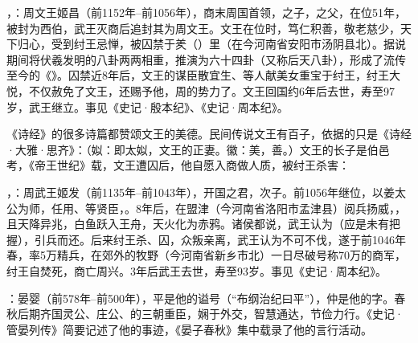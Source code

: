 ，：周文王姬昌（前1152年--前1056年），商末周国首领，之子，之父，在位51年，被封为西伯，武王灭商后追封其为周文王。文王在位时，笃仁积善，敬老慈少，天下归心，受到纣王忌惮，被囚禁于羑（）里（在今河南省安阳市汤阴县北）。据说期间将伏羲发明的八卦两两相重，推演为六十四卦（又称后天八卦），形成了流传至今的《》。囚禁近8年后，文王的谋臣散宜生、等人献美女重宝于纣王，纣王大悦，不仅赦免了文王，还赐予他，周的势力了。文王回国约6年后去世，寿至97岁，武王继立。事见《史记·殷本纪》、《史记·周本纪》。%

《诗经》的很多诗篇都赞颂文王的美德。民间传说文王有百子，依据的只是《诗经·大雅·思齐》：（姒：即太姒，文王的正妻。徽：美，善。）文王的长子是伯邑考，《帝王世纪》载，文王遭囚后，他自愿入商做人质，被纣王杀害： %

，：周武王姬发（前1135年--前1043年），开国之君，次子。前1056年继位，以姜太公为师，任用、等贤臣，。8年后，在盟津（今河南省洛阳市孟津县）阅兵扬威，，且天降异兆，白鱼跃入王舟，天火化为赤鸦。诸侯都说，武王认为（应是未有把握），引兵而还。后来纣王杀、囚，众叛亲离，武王认为不可不伐，遂于前1046年春，率5万精兵，在郊外的牧野（今河南省新乡市北）一日尽破号称70万的商军，纣王自焚死，商亡周兴。3年后武王去世，寿至93岁。事见《史记·周本纪》。

：晏婴（前578年--前500年），平是他的谥号（“布纲治纪曰平”），仲是他的字。春秋后期齐国灵公、庄公、的三朝重臣，娴于外交，智慧通达，节俭力行。《史记·管晏列传》简要记述了他的事迹，《晏子春秋》集中载录了他的言行活动。

